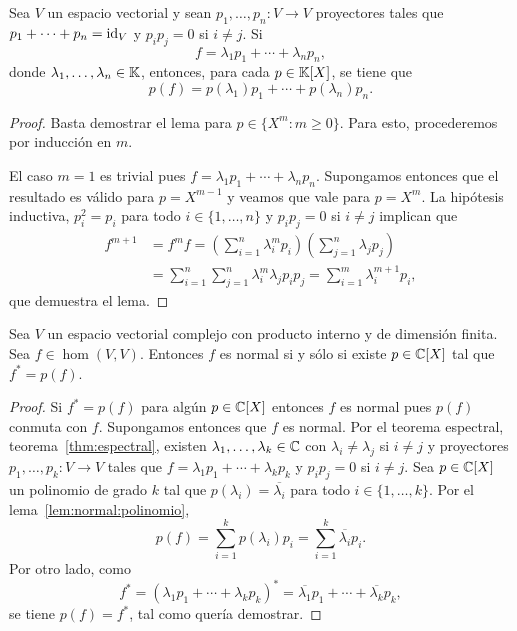 \begin{lem}
	\label{lem:normal:polinomio}
	Sea $V$ un espacio vectorial y sean $p_1,\dots,p_n\colon V\to V$
	proyectores tales que $p_1+\cdots+p_n=\operatorname{id}_V$ y $p_ip_j=0$ si $i\ne j$. Si 
    \[
    f=\lambda_1p_1+\cdots+\lambda_np_n,
    \] 
    donde $\lambda_1,\dots,\lambda_n\in\mathbb{K}$, entonces, para cada $p\in\mathbb{K}[X]$, se
    tiene que 
    \[
        p(f)=p(\lambda_1)p_1+\cdots+p(\lambda_n)p_n. 
    \]

	\begin{proof}
		Basta demostrar el lema para $p\in\{X^m:m\geq0\}$. Para esto, procederemos por
		inducción en $m$.

		El caso $m=1$ es trivial pues $f=\lambda_1p_1+\cdots+\lambda_np_n$.
		Supongamos entonces que el resultado es válido para $p=X^{m-1}$ y veamos que
		vale para $p=X^m$. La hipótesis inductiva, $p_i^2=p_i$ para todo
		$i\in\{1,\dots,n\}$ y $p_ip_j=0$ si $i\ne j$ implican que 
		\begin{align*}
		f^{m+1}&=f^mf=\left(\sum_{i=1}^n\lambda_i^mp_i\right)\left(\sum_{j=1}^n\lambda_jp_j\right)\\
		&=\sum_{i=1}^n\sum_{j=1}^n\lambda_i^m\lambda_jp_ip_j=\sum_{i=1}^m\lambda_i^{m+1}p_i,
		\end{align*}
		que demuestra el lema.	
	\end{proof}
\end{lem}

\begin{thm}
    Sea $V$ un espacio vectorial complejo con producto interno y de dimensión
    finita. Sea $f\in\hom(V,V)$. Entonces $f$ es normal si y sólo si existe
    $p\in\mathbb{C}[X]$ tal que $f^*=p(f)$. 

	\begin{proof}
		Si $f^*=p(f)$ para algún $p\in\mathbb{C}[X]$ entonces $f$ es normal pues $p(f)$
		conmuta con $f$. Supongamos entonces que $f$ es normal. Por
		el teorema espectral, teorema~\ref{thm:espectral}, existen
		$\lambda_1,\dots,\lambda_k\in\mathbb{C}$ con $\lambda_i\ne\lambda_j$ si $i\ne
		j$ y proyectores $p_1,\dots,p_k\colon V\to V$ tales que
		$f=\lambda_1p_1+\cdots+\lambda_kp_k$ y $p_ip_j=0$ si $i\ne j$. Sea
		$p\in\mathbb{C}[X]$ un polinomio de grado $k$ tal que
		$p(\lambda_i)=\overline{\lambda_i}$ para todo $i\in\{1,\dots,k\}$.
		Por el lema~\ref{lem:normal:polinomio},
		\[
		p(f)=\sum_{i=1}^kp(\lambda_i)p_i=\sum_{i=1}^k\overline{\lambda_i}p_i.
		\]
		Por otro lado, como 
		\[
		f^*=(\lambda_1p_1+\cdots+\lambda_kp_k)^*=\overline{\lambda_1}p_1+\cdots+\overline{\lambda_k}p_k, 
		\]
		se tiene $p(f)=f^*$, tal como quería demostrar.
	\end{proof}
\end{thm}

